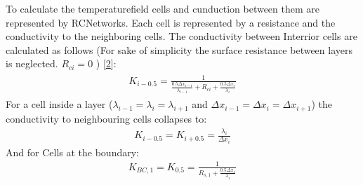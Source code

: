 \documentclass[letterpaper,10pt,english]{jupyterBook}
\begin{document}
\sphinxAtStartPar
To calculate the temperaturefield cells and cunduction between them are represented by RC\sphinxhyphen{}Networks. Each cell is represented by a resistance and the conductivity to the neighboring cells. The conductivity between Interrior cells are calculated as follows (For sake of simplicity the surface resistance between layers is neglected. \( R_{ci} =0 \) ) {[}\hyperlink{cite.Aufgabe1:id7}{2}{]}:
\begin{equation}\label{equation:Aufgabe1:conductivityInterior}
\begin{split}\begin{align}
 K_{i-0.5} = \frac{1}{\frac{0.5 \Delta x_{i-1}}{\lambda_{i-1}} + R_{ci} + \frac{0.5 \Delta x_{i}}{\lambda_{i}}} 
\end{align}\end{split}
\end{equation}
\sphinxAtStartPar
For a cell inside a layer (\(\lambda_{i-1} = \lambda_{i} = \lambda_{i+1}\) and \(\Delta x_{i-1} = \Delta x_{i} = \Delta x_{i+1}\)) the conductivity to neighbouring cells collapses to:
\begin{equation}\label{equation:Aufgabe1:conductivityInterior2}
\begin{split}K_{i-0.5} = K_{i+0.5} = \frac{\lambda_{i}}{\Delta x_{i}}\end{split}
\end{equation}
\sphinxAtStartPar
And for Cells at the boundary:
\begin{equation}\label{equation:Aufgabe1:conductivityExterior}
\begin{split}K_{BC,1} = K_{0.5} = \frac{1}{R_{s,1} + \frac{0.5 \Delta x_{1}}{\lambda_{1}}}\end{split}
\end{equation}
\end{document}
